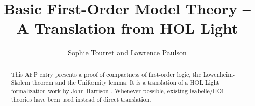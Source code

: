 \documentclass[11pt,a4paper]{article}
\begin{document}
\title{Basic First-Order Model Theory -- A Translation from HOL Light}
\author{Sophie Tourret and Lawrence Paulson}
\maketitle
\begin{abstract}
  This AFP entry presents a proof of compactness of first-order logic, the Löwenheim-Skolem theorem and the Uniformity lemma.
  It is a translation of a HOL Light formalization work by John Harrison \cite{harrison98model}.
  Whenever possible, existing Isabelle/HOL theories have been used instead of direct translation.
\end{abstract}
\tableofcontents



\end{document}
